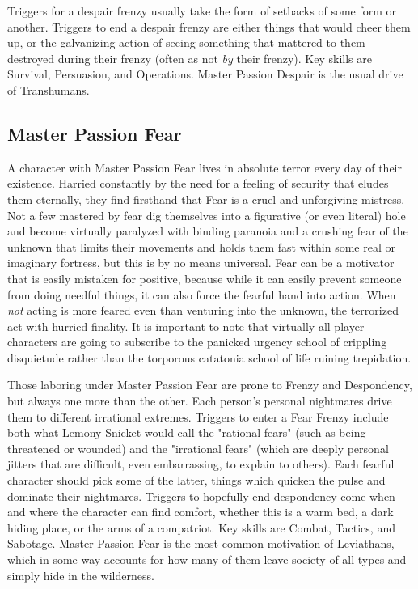 Triggers for a despair frenzy usually take the form of setbacks of some form or another. Triggers to end a despair frenzy are either things that would cheer them up, or the galvanizing action of seeing something that mattered to them destroyed during their frenzy (often as not \textit{by} their frenzy). Key skills are Survival, Persuasion, and Operations. Master Passion Despair is the usual drive of Transhumans.

\subsection{Master Passion Fear}

A character with Master Passion Fear lives in absolute terror every day of their existence. Harried constantly by the need for a feeling of security that eludes them eternally, they find firsthand that Fear is a cruel and unforgiving mistress. Not a few mastered by fear dig themselves into a figurative (or even literal)  hole and become virtually paralyzed with binding paranoia and a crushing fear of the unknown that limits their movements and holds them fast within some real or imaginary fortress, but this is by no means universal. Fear can be a motivator that is easily mistaken for positive, because while it can easily prevent someone from doing needful things, it can also force the fearful hand into action. When \textit{not} acting is more feared even than venturing into the unknown, the terrorized act with hurried finality. It is important to note that virtually all player characters are going to subscribe to the panicked urgency school of crippling disquietude rather than the torporous catatonia school of life ruining trepidation.

Those laboring under Master Passion Fear are prone to Frenzy and Despondency, but always one more than the other. Each person's personal nightmares drive them to different irrational extremes. Triggers to enter a Fear Frenzy include both what Lemony Snicket would call the "rational fears" (such as being threatened or wounded) and the "irrational fears" (which are deeply personal jitters that are difficult, even embarrassing, to explain to others). Each fearful character should pick some of the latter, things which quicken the pulse and dominate their nightmares. Triggers to hopefully end despondency come when and where the character can find comfort, whether this is a warm bed, a dark hiding place, or the arms of a compatriot. Key skills are Combat, Tactics, and Sabotage. Master Passion Fear is the most common motivation of Leviathans, which in some way accounts for how many of them leave society of all types and simply hide in the wilderness.

